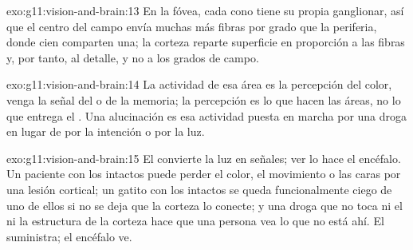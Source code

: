 \begin{solution}{exo:g11:vision-and-brain:13}
En la fóvea, cada cono tiene su propia  ganglionar, así que el
centro del campo envía muchas más fibras por grado que la periferia,
donde cien  comparten una; la corteza reparte superficie en
proporción a las fibras y, por tanto, al detalle, y no a los grados de
campo.
\end{solution}

\begin{solution}{exo:g11:vision-and-brain:14}
La actividad de esa área es la percepción del color, venga la señal del
 o de la memoria; la percepción es lo que hacen las áreas, no lo que
entrega el . Una alucinación es esa actividad puesta en marcha por
una droga en lugar de por la intención o por la luz.
\end{solution}

\begin{solution}{exo:g11:vision-and-brain:15}
El  convierte la luz en señales; ver lo hace el encéfalo. Un
paciente con los  intactos puede perder el color, el movimiento o
las caras por una lesión cortical; un gatito con los  intactos se
queda funcionalmente ciego de uno de ellos si no se deja que la corteza
lo conecte; y una droga que no toca ni el  ni la estructura de la
corteza hace que una persona vea lo que no está ahí. El  suministra;
el encéfalo ve.
\end{solution}

